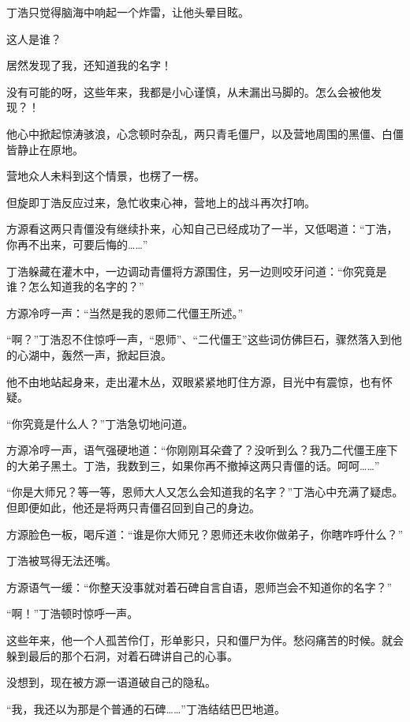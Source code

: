 
\begin{this_body}

丁浩只觉得脑海中响起一个炸雷，让他头晕目眩。

这人是谁？

居然发现了我，还知道我的名字！

没有可能的呀，这些年来，我都是小心谨慎，从未漏出马脚的。怎么会被他发现？！

他心中掀起惊涛骇浪，心念顿时杂乱，两只青毛僵尸，以及营地周围的黑僵、白僵皆静止在原地。

营地众人未料到这个情景，也楞了一楞。

但旋即丁浩反应过来，急忙收束心神，营地上的战斗再次打响。

方源看这两只青僵没有继续扑来，心知自己已经成功了一半，又低喝道：“丁浩，你再不出来，可要后悔的……”

丁浩躲藏在灌木中，一边调动青僵将方源围住，另一边则咬牙问道：“你究竟是谁？怎么知道我的名字的？”

方源冷哼一声：“当然是我的恩师二代僵王所述。”

“啊？”丁浩忍不住惊呼一声，“恩师”、“二代僵王”这些词仿佛巨石，骤然落入到他的心湖中，轰然一声，掀起巨浪。

他不由地站起身来，走出灌木丛，双眼紧紧地盯住方源，目光中有震惊，也有怀疑。

“你究竟是什么人？”丁浩急切地问道。

方源冷哼一声，语气强硬地道：“你刚刚耳朵聋了？没听到么？我乃二代僵王座下的大弟子黑土。丁浩，我数到三，如果你再不撤掉这两只青僵的话。呵呵……”

“你是大师兄？等一等，恩师大人又怎么会知道我的名字？”丁浩心中充满了疑虑。但即便如此，他还是将两只青僵召回到自己的身边。

方源脸色一板，喝斥道：“谁是你大师兄？恩师还未收你做弟子，你瞎咋呼什么？”

丁浩被骂得无法还嘴。

方源语气一缓：“你整天没事就对着石碑自言自语，恩师岂会不知道你的名字？”

“啊！”丁浩顿时惊呼一声。

这些年来，他一个人孤苦伶仃，形单影只，只和僵尸为伴。愁闷痛苦的时候。就会躲到最后的那个石洞，对着石碑讲自己的心事。

没想到，现在被方源一语道破自己的隐私。

“我，我还以为那是个普通的石碑……”丁浩结结巴巴地道。


\end{this_body}
